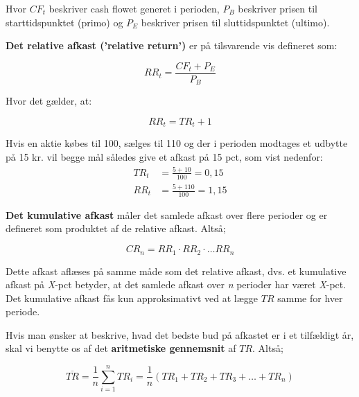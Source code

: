 \documentclass[10pt,reqno, usenames]{article}
\begin{document}
Hvor $CF_t$ beskriver cash flowet generet i perioden, $P_B$ beskriver prisen til starttidspunktet (primo) og $P_E$ beskriver prisen til sluttidspunktet (ultimo).

\vspace{10 pt}

\textbf{ Det relative afkast ('relative return')} er på tilsvarende vis defineret som: 

\begin{equation}
    RR_t = \frac{CF_t + P_E}{P_B}
\end{equation}

Hvor det gælder, at: 

\begin{equation}
    RR_t = TR_t + 1
\end{equation}

Hvis en aktie købes til 100, sælges til 110 og der i perioden modtages et udbytte på 15 kr. vil begge mål således give et afkast på 15 pct, som vist nedenfor: 
\begin{align*}
    TR_t &= \frac{5 + 10}{100} = 0,15 \\
    RR_t &= \frac{5 + 110}{100} = 1,15
\end{align*}

\vspace{10 pt}

\textbf{Det kumulative afkast} måler det samlede afkast over flere perioder og er defineret som produktet af de relative afkast. Altså; 

\begin{equation}
    CR_n = RR_1 \cdot RR_2 \cdot \dots RR_n
\end{equation}

Dette afkast aflæses på samme måde som det relative afkast, dvs. et kumulative afkast på \textit{X}-pct betyder, at det samlede afkast over \textit{n} perioder har været \textit{X}-pct. Det kumulative afkast fås kun approksimativt ved at lægge $TR$ samme for hver periode. 

\vspace{10 pt}

Hvis man ønsker at beskrive, hvad det bedste bud på afkastet er i et tilfældigt år, skal vi benytte os af det \textbf{aritmetiske gennemsnit} af $TR$. Altså; 

\begin{equation}
    \overline{TR} = \frac{1}{n} \sum_{i=1}^{n} TR_i = \frac{1}{n} (TR_1 + TR_2 + TR_3 + \ldots + TR_n)
\end{equation}
\end{document}
